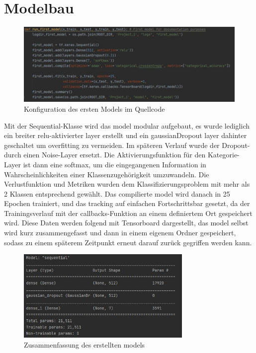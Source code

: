 \documentclass[letterpaper,10pt]{article}
\begin{document}
\section{Modelbau}
    \begin{figure} [t]
        \centering
        \includegraphics[width=\textwidth]{firstmodel.JPG}
        \caption{Konfiguration des ersten Models im Quellcode}
    \end{figure}
    Mit der Sequential-Klasse wird das model modular aufgebaut, es wurde lediglich ein breiter relu-aktivierter layer erstellt und ein gaussianDropout layer dahinter geschaltet um overfitting zu vermeiden. Im späteren Verlauf wurde der Dropout- durch einen Noise-Layer ersetzt. Die Aktivierungsfunktion für den Kategorie-Layer ist dann eine softmax, um die eingegangenen Information in Wahrscheinlichkeiten einer Klassenzugehörigkeit umzuwandeln. Die Verlustfunktion und Metriken wurden dem Klassifizierungsproblem mit mehr als 2 Klassen entsprechend gewählt. Das compilierte model wird danach in 25 Epochen trainiert, und das tracking auf einfachen Fortschrittsbar gesetzt, da der Trainingsverlauf mit der callbacks-Funktion an einem definiertem Ort gespeichert wird. Diese Daten werden folgend mit Tensorboard dargestellt, das model selbst wird kurz zusammengefasst und dann in einem eigenem Ordner gespeichert, sodass zu einem späterem Zeitpunkt erneut darauf zurück gegriffen werden kann.
    \begin{figure} [h]
        \centering
        \includegraphics[width=0.75\textwidth]{firstmodel2.JPG}
        \caption{Zusammenfassung des erstellten models}
    \end{figure}
    
\end{document}
